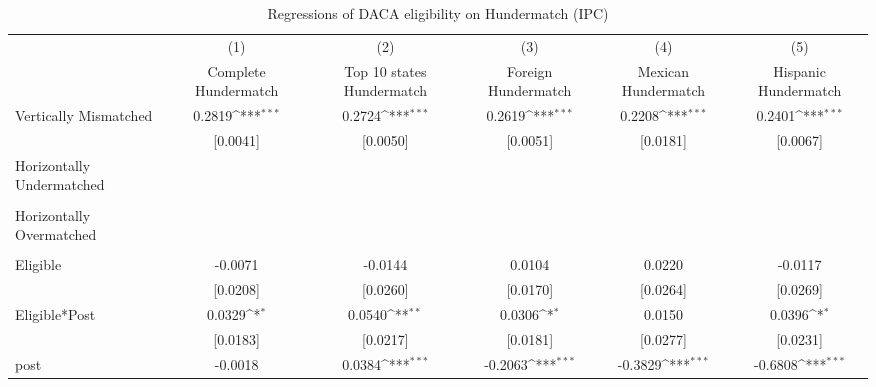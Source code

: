 \begin{table}[htbp]\centering
\def\sym#1{\ifmmode^{#1}\else\(^{#1}\)\fi}
\caption{Regressions of DACA eligibility on Hundermatch (IPC)}
\begin{tabular}{l*{5}{c}}
\toprule
                    &\multicolumn{1}{c}{(1)}         &\multicolumn{1}{c}{(2)}         &\multicolumn{1}{c}{(3)}         &\multicolumn{1}{c}{(4)}         &\multicolumn{1}{c}{(5)}         \\
                    &Complete Hundermatch         &Top 10 states Hundermatch         &Foreign Hundermatch         &Mexican Hundermatch         &Hispanic Hundermatch         \\
\midrule
Vertically Mismatched&      0.2819\sym{***}&      0.2724\sym{***}&      0.2619\sym{***}&      0.2208\sym{***}&      0.2401\sym{***}\\
                    &    [0.0041]         &    [0.0050]         &    [0.0051]         &    [0.0181]         &    [0.0067]         \\
\addlinespace
Horizontally Undermatched&                     &                     &                     &                     &                     \\
                    &                     &                     &                     &                     &                     \\
\addlinespace
Horizontally Overmatched&                     &                     &                     &                     &                     \\
                    &                     &                     &                     &                     &                     \\
\addlinespace
Eligible            &     -0.0071         &     -0.0144         &      0.0104         &      0.0220         &     -0.0117         \\
                    &    [0.0208]         &    [0.0260]         &    [0.0170]         &    [0.0264]         &    [0.0269]         \\
\addlinespace
Eligible*Post       &      0.0329\sym{*}  &      0.0540\sym{**} &      0.0306\sym{*}  &      0.0150         &      0.0396\sym{*}  \\
                    &    [0.0183]         &    [0.0217]         &    [0.0181]         &    [0.0277]         &    [0.0231]         \\
\addlinespace
post                &     -0.0018         &      0.0384\sym{***}&     -0.2063\sym{***}&     -0.3829\sym{***}&     -0.6808\sym{***}\\

\end{tabular}
\end{table}
